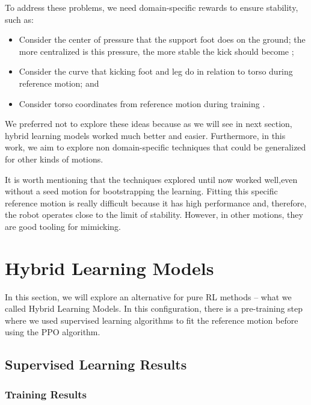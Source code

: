 To address these problems, we need domain-specific rewards to ensure stability, such as:

\begin{itemize}
	\item Consider the center of pressure that the support foot does on the ground; the more centralized is this pressure, the more stable the kick should become \cite{phdmanga};
	\item Consider the curve that kicking foot and leg do in relation to torso during reference motion; and
	\item Consider torso coordinates from reference motion during training \cite{peng2018}.
\end{itemize}

We preferred not to explore these ideas because as we will see in next section, hybrid learning models worked much better and easier. Furthermore, in this work, we aim to explore non domain-specific techniques that could be generalized for other kinds of motions.

It is worth mentioning that the techniques explored until now worked well,even without a seed motion for bootstrapping the learning. Fitting this specific reference motion is really difficult because it has high performance and, therefore, the robot operates close to the limit of stability. However, in other motions, they are good tooling for mimicking.

\section{Hybrid Learning Models}
In this section, we will explore an alternative for pure RL methods -- what we called Hybrid Learning Models. In this configuration, there is a pre-training step where we used supervised learning algorithms to fit the reference motion before using the PPO algorithm.

\subsection{Supervised Learning Results}
\subsubsection{Training Results}

